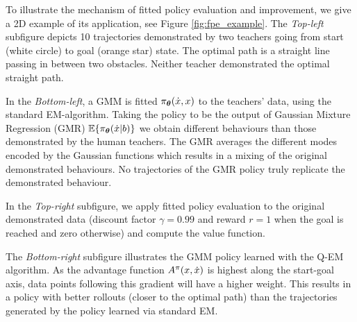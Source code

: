 To illustrate the mechanism of fitted policy evaluation and improvement, we give a 2D example 
of its application, see Figure \ref{fig:fpe_example}. The \textit{Top-left} subfigure
depicts 10 trajectories demonstrated by two teachers going from start (white circle) to goal (orange star) state. 
The optimal path is a straight line passing in between two obstacles. 
Neither teacher demonstrated the optimal straight path. 

In the \textit{Bottom-left}, a GMM is fitted $\pi_{\boldsymbol{\theta}}(\dot{x},x)$ to the teachers' data, using the standard EM-algorithm.
Taking the policy to be the output of Gaussian Mixture Regression (GMR) $\mathbb{E}\{\pi_{\boldsymbol{\theta}}(\dot{x}|b)\}$ we obtain different
behaviours than those demonstrated by the human teachers. The GMR averages the different modes encoded by the Gaussian functions 
which results in a mixing of the original demonstrated behaviours. No trajectories of the GMR policy truly replicate 
the demonstrated behaviour. 

In the \textit{Top-right} subfigure, we apply fitted policy evaluation to the original demonstrated data (discount 
factor $\gamma=0.99$ and reward $r=1$ when the goal is reached and zero otherwise) and compute the value function.

The \textit{Bottom-right} subfigure illustrates the GMM policy learned with the Q-EM algorithm. As 
the advantage function $ A^{\pi}(x,\dot{x})$ is highest along the start-goal axis, data points
following this gradient will have a higher weight. This results in a policy with better 
rollouts (closer to the optimal path) than the trajectories generated by the policy learned via standard EM. 

